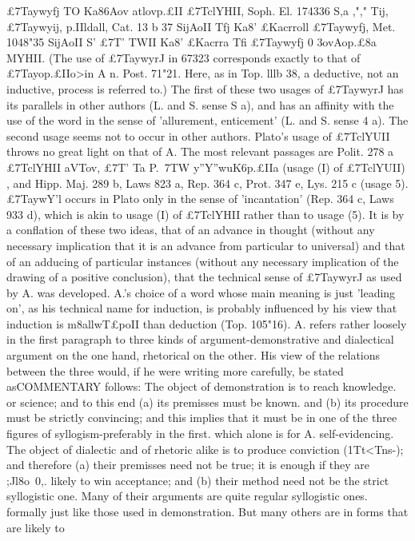 {{{{{{{{{{{{{{{{{£7Taywyfj TO Ka86Aov atlovp.£II £7TclYHII, Soph. El. 174336 S,a ,"," Tij,
£7Taywyij, p.IIldall, Cat. 13 b 37 SijAoII Tfj Ka8' £Kacrroll £7Taywyfj, Met.
1048"35 SijAoII S' £7T' TWII Ka8' £Kacrra Tfi £7Taywyfj 0 {3ovAop.£8a MYHII.
(The use of £7TaywyrJ in 67323 corresponds exactly to that of
£7Tayop.£IIo>in A n. Post. 71"21. Here, as in Top. lllb 38, a deductive,
not an inductive, process is referred to.)
The first of these two usages of £7TaywyrJ has its parallels in
other authors (L. and S. sense S a), and has an affinity with the
use of the word in the sense of 'allurement, enticement' (L. and S.
sense 4 a). The second usage seems not to occur in other authors.
Plato's usage of £7TclYUII throws no great light on that of A.
The most relevant passages are Polit. 278 a £7TclYHII aVTov, £7T'
Ta P.~7TW y''Y''wuK6p.£IIa (usage (I) of £7TclYUII) , and Hipp. Maj.
289 b, Laws 823 a, Rep. 364 c, Prot. 347 e, Lys. 215 c (usage 5).
£7TaywY'l occurs in Plato only in the sense of 'incantation' (Rep.
364 c, Laws 933 d), which is akin to usage (I) of £7TclYHII rather than
to usage (5).
It is by a conflation of these two ideas, that of an advance in
thought (without any necessary implication that it is an advance
from particular to universal) and that of an adducing of particular
instances (without any necessary implication of the drawing of
a positive conclusion), that the technical sense of £7TaywyrJ as
used by A. was developed. A.'s choice of a word whose main
meaning is just 'leading on', as his technical name for induction, is
probably influenced by his view that induction is m8allwT£poII
than deduction (Top. 105"16).
A. refers rather loosely in the first paragraph to three kinds of
argument-demonstrative and dialectical argument on the one
hand, rhetorical on the other. His view of the relations between
the three would, if he were writing more carefully, be stated asCOMMENTARY
follows: The object of demonstration is to reach knowledge. or
science; and to this end (a) its premisses must be known. and (b)
its procedure must be strictly convincing; and this implies that
it must be in one of the three figures of syllogism-preferably in
the first. which alone is for A. self-evidencing. The object of
dialectic and of rhetoric alike is to produce conviction (1Tt<Tns-);
and therefore (a) their premisses need not be true; it is enough if
they are ;Jl8o~0,. likely to win acceptance; and (b) their method
need not be the strict syllogistic one. Many of their arguments
are quite regular syllogistic ones. formally just like those used in
demonstration. But many others are in forms that are likely to
}}}}}}}}}}}}}}}}}}
